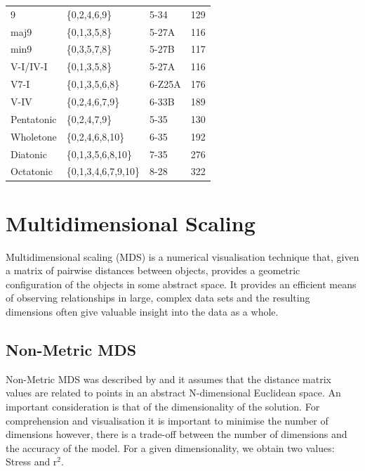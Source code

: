 \documentclass{article}
\begin{document}
\begin{table}[htb]
\begin{center}
\begin{tabular}{lllr}
\hline
 9           &  \{0,2,4,6,9\}         &  5-34        &    129  \\
 maj9        &  \{0,1,3,5,8\}         &  5-27A       &    116  \\
 min9        &  \{0,3,5,7,8\}         &  5-27B       &    117  \\
\hline
 V-I/IV-I    &  \{0,1,3,5,8\}         &  5-27A       &    116  \\
 V7-I        &  \{0,1,3,5,6,8\}       &  6-Z25A      &    176  \\
 V-IV        &  \{0,2,4,6,7,9\}       &  6-33B       &    189  \\
\hline
 Pentatonic  &  \{0,2,4,7,9\}         &  5-35        &    130  \\
 Wholetone   &  \{0,2,4,6,8,10\}      &  6-35        &    192  \\
 Diatonic    &  \{0,1,3,5,6,8,10\}    &  7-35        &    276  \\
 Octatonic   &  \{0,1,3,4,6,7,9,10\}  &  8-28        &    322  \\
\hline
\end{tabular}
\end{center}
\end{table}
\section{Multidimensional Scaling}
\label{sec-4}

Multidimensional scaling (MDS) is a numerical visualisation technique
that, given a matrix of pairwise distances between objects, provides a
geometric configuration of the objects in some abstract space. It
provides an efficient means of observing relationships in large,
complex data sets and the resulting dimensions often give valuable
insight into the data as a whole.
\subsection{Non-Metric MDS}
\label{sec-4-1}

Non-Metric MDS was described by \citet{Shepard1962} and it assumes
that the distance matrix values are related to points in an abstract
N-dimensional Euclidean space. An important consideration is that of
the dimensionality of the solution. For comprehension and
visualisation it is important to minimise the number of dimensions
however, there is a trade-off between the number of dimensions and the
accuracy of the model. For a given dimensionality, we obtain two
values: Stress and r$^2$.
\end{document}

